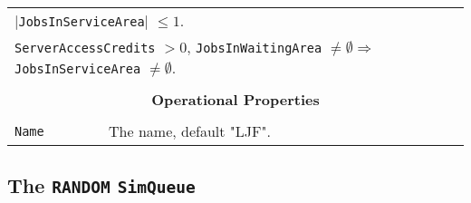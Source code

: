 \documentclass[12pt]{book}
\begin{document}
\begin{tabular}{|l|l|l|l|}
\multicolumn{4}{|l|}{$|$\lstinline|JobsInServiceArea|$|$ $\leq 1$.} \\
\multicolumn{4}{|l|}{\lstinline|ServerAccessCredits| $> 0$, \lstinline|JobsInWaitingArea| $\neq \emptyset
                     \Rightarrow$ \lstinline|JobsInServiceArea| $\neq \emptyset$.} \\
\hline
\multicolumn{4}{|c|}{} \\
\multicolumn{4}{|c|}{\bf Operational Properties} \\
\multicolumn{4}{|c|}{} \\
\hline
\lstinline|Name| & \multicolumn{3}{|l|}{The name, default "LJF".} \\
\hline
\end{tabular}

\subsection{The \lstinline{RANDOM} \lstinline{SimQueue}}
\end{document}
